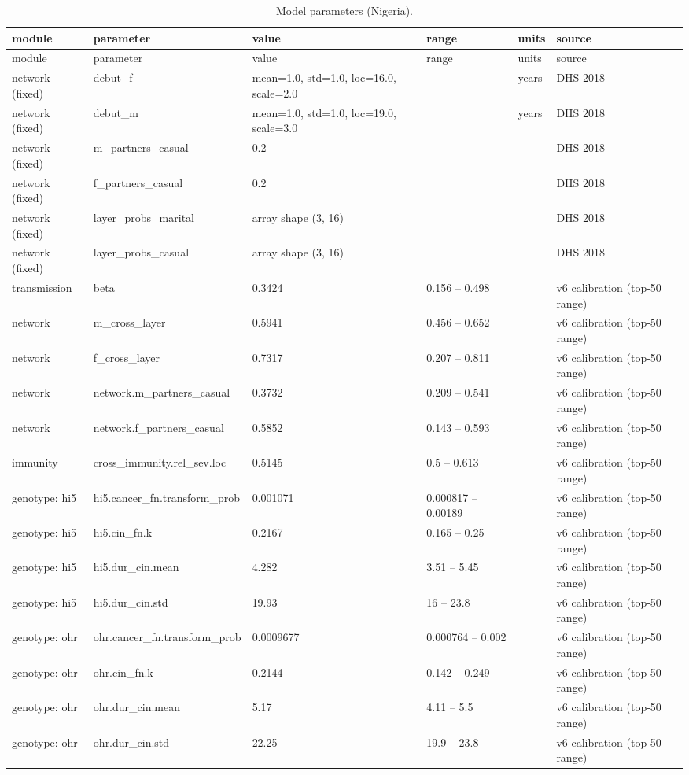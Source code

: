 \begin{longtable}{llllll}
\caption{Model parameters (Nigeria).} \label{tab:pars} \\
\toprule
module & parameter & value & range & units & source \\
\midrule
\endfirsthead
\toprule
module & parameter & value & range & units & source \\
\midrule
\endhead
\bottomrule
\endfoot
network (fixed) & debut\_f & mean=1.0, std=1.0, loc=16.0, scale=2.0 &  & years & DHS 2018 \\
network (fixed) & debut\_m & mean=1.0, std=1.0, loc=19.0, scale=3.0 &  & years & DHS 2018 \\
network (fixed) & m\_partners\_casual & 0.2 &  &  & DHS 2018 \\
network (fixed) & f\_partners\_casual & 0.2 &  &  & DHS 2018 \\
network (fixed) & layer\_probs\_marital & array shape (3, 16) &  &  & DHS 2018 \\
network (fixed) & layer\_probs\_casual & array shape (3, 16) &  &  & DHS 2018 \\
transmission & beta & 0.3424 & 0.156 – 0.498 &  & v6 calibration (top-50 range) \\
network & m\_cross\_layer & 0.5941 & 0.456 – 0.652 &  & v6 calibration (top-50 range) \\
network & f\_cross\_layer & 0.7317 & 0.207 – 0.811 &  & v6 calibration (top-50 range) \\
network & network.m\_partners\_casual & 0.3732 & 0.209 – 0.541 &  & v6 calibration (top-50 range) \\
network & network.f\_partners\_casual & 0.5852 & 0.143 – 0.593 &  & v6 calibration (top-50 range) \\
immunity & cross\_immunity.rel\_sev.loc & 0.5145 & 0.5 – 0.613 &  & v6 calibration (top-50 range) \\
genotype: hi5 & hi5.cancer\_fn.transform\_prob & 0.001071 & 0.000817 – 0.00189 &  & v6 calibration (top-50 range) \\
genotype: hi5 & hi5.cin\_fn.k & 0.2167 & 0.165 – 0.25 &  & v6 calibration (top-50 range) \\
genotype: hi5 & hi5.dur\_cin.mean & 4.282 & 3.51 – 5.45 &  & v6 calibration (top-50 range) \\
genotype: hi5 & hi5.dur\_cin.std & 19.93 & 16 – 23.8 &  & v6 calibration (top-50 range) \\
genotype: ohr & ohr.cancer\_fn.transform\_prob & 0.0009677 & 0.000764 – 0.002 &  & v6 calibration (top-50 range) \\
genotype: ohr & ohr.cin\_fn.k & 0.2144 & 0.142 – 0.249 &  & v6 calibration (top-50 range) \\
genotype: ohr & ohr.dur\_cin.mean & 5.17 & 4.11 – 5.5 &  & v6 calibration (top-50 range) \\
genotype: ohr & ohr.dur\_cin.std & 22.25 & 19.9 – 23.8 &  & v6 calibration (top-50 range) \\
\bottomrule
\end{longtable}
